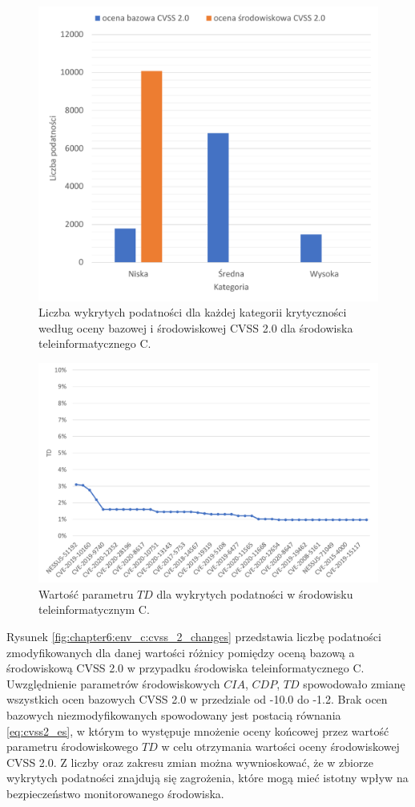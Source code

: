 \begin{figure}[!ht]
\centering
\includegraphics[width=.9\textwidth]{Chapters/Eksperymenty/env_C_results/cvss_2.pdf}
\caption{Liczba wykrytych podatności dla każdej kategorii krytyczności według oceny bazowej i środowiskowej CVSS 2.0 dla środowiska teleinformatycznego C.}
\label{fig:chapter6:env_c:cvss_2}
\end{figure}

\begin{figure}[!ht]
\centering
\includegraphics[width=.9\textwidth]{Chapters/Eksperymenty/env_C_results/cvss_2_td_env_c.pdf}
\caption{Wartość parametru $TD$ dla wykrytych podatności w środowisku teleinformatycznym C.}
\label{fig:chapter6:env_c:cvss_2_td}
\end{figure}

\bigbreak
Rysunek \ref{fig:chapter6:env_c:cvss_2_changes} przedstawia liczbę podatności zmodyfikowanych dla danej wartości różnicy pomiędzy oceną bazową a środowiskową CVSS 2.0 w przypadku środowiska teleinformatycznego C. Uwzględnienie parametrów środowiskowych $CIA$, $CDP$, $TD$ spowodowało zmianę wszystkich ocen bazowych CVSS 2.0 w przedziale od -10.0 do -1.2. Brak ocen bazowych niezmodyfikowanych spowodowany jest postacią równania \ref{eq:cvss2_es}, w którym to występuje mnożenie oceny końcowej przez wartość parametru środowiskowego $TD$ w celu otrzymania wartości oceny środowiskowej CVSS 2.0. Z liczby oraz zakresu zmian można wywnioskować, że w zbiorze wykrytych podatności znajdują się zagrożenia, które mogą mieć istotny wpływ na bezpieczeństwo monitorowanego środowiska. 

